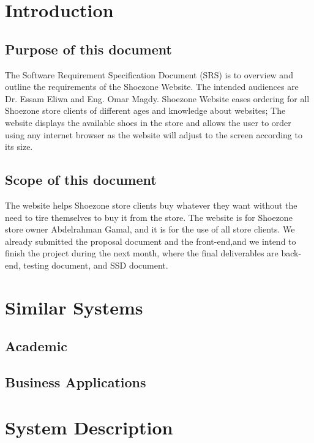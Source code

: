 \documentclass[12pt]{article}
\begin{document}
\section{Introduction}
\subsection{Purpose of this document}
The Software Requirement Specification Document (SRS) is to overview and outline the requirements of the Shoezone Website. The intended audiences are Dr. Essam Eliwa and Eng. Omar Magdy. Shoezone Website eases ordering for all Shoezone store clients of different ages and knowledge about websites; The website displays the available shoes in the store and allows the user to order using any internet browser as the website will adjust to the screen according to its size.
\subsection{Scope of this document}
The website helps Shoezone store clients buy whatever they want without the need to tire themselves to buy it from the store. The website is for Shoezone store owner Abdelrahman Gamal, and it is for the use of all store clients.
We already submitted the proposal document and the front-end,and we intend to finish the project during the next month, where the final deliverables are back-end, testing document, and SSD document. 




\section{Similar Systems}
\subsection{Academic}

\subsection{Business Applications}
\section{System Description}
\end{document}
